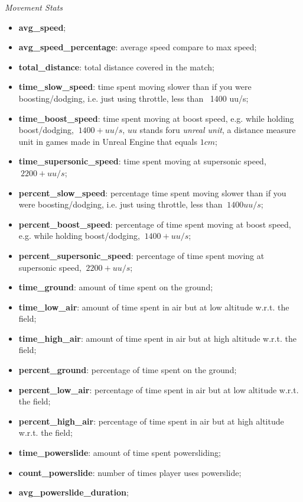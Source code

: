 \begin{center}
    \textit{Movement Stats}
\end{center}
\begin{itemize}
    \item \textbf{avg\_speed};
    \item \textbf{avg\_speed\_percentage}: average speed compare to max speed;
    \item \textbf{total\_distance}: total distance covered in the match;
    \item \textbf{time\_slow\_speed}:  time spent moving slower than if you were boosting/dodging, i.e. just using throttle, less than ~1400 uu/s;
    \item \textbf{time\_boost\_speed}: time spent moving at boost speed, e.g. while holding boost/dodging, $~1400+ uu/s$, $uu$ stands foru \textit{unreal unit}, a distance measure unit in games made in Unreal Engine that equals $1 cm$;
    \item \textbf{time\_supersonic\_speed}: time spent moving at supersonic speed, $~ 2200+ uu/s$;
    \item \textbf{percent\_slow\_speed}: percentage time spent moving slower than if you were boosting/dodging, i.e. just using throttle, less than $~1400 uu/s$;
    \item \textbf{percent\_boost\_speed}: percentage of time spent moving at boost speed, e.g. while holding boost/dodging, $~1400+ uu/s$;
    \item \textbf{percent\_supersonic\_speed}: percentage of time spent moving at supersonic speed, $~ 2200+ uu/s$;
    \item \textbf{time\_ground}: amount of time spent on the ground;
    \item \textbf{time\_low\_air}: amount of time spent in air but at low altitude w.r.t. the field;
    \item \textbf{time\_high\_air}: amount of time spent in air but at high altitude w.r.t. the field;
    \item \textbf{percent\_ground}: percentage of time spent on the ground;
    \item \textbf{percent\_low\_air}: percentage of time spent in air but at low altitude w.r.t. the field;
    \item \textbf{percent\_high\_air}: percentage of time spent in air but at high altitude w.r.t. the field;
    \item \textbf{time\_powerslide}: amount of time spent powersliding;
    \item \textbf{count\_powerslide}: number of times player uses powerslide;
    \item \textbf{avg\_powerslide\_duration};
\end{itemize}

